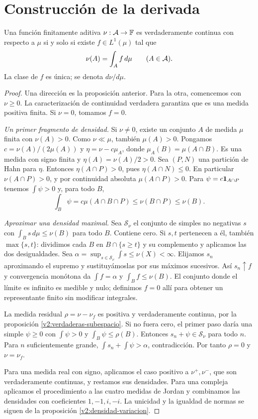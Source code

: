 \section{Construcción de la derivada}
\begin{teorema}\label{v2:radon-nikodym}
Una función finitamente aditiva $\nu:\mathcal A\to\mathbb F$ es verdaderamente continua con respecto a $\mu$ si y solo si existe $f\in L^1(\mu)$ tal que
\[
 \nu(A)=\int_A f\,d\mu\qquad(A\in\mathcal A).
\]
La clase de $f$ es única; se denota $d\nu/d\mu$.
\end{teorema}
\begin{proof}
Una dirección es la proposición anterior. Para la otra, comencemos con $\nu\ge0$. La caracterización de continuidad verdadera garantiza que es una medida positiva finita. Si $\nu=0$, tomamos $f=0$.

\emph{Un primer fragmento de densidad.} Si $\nu\ne0$, existe un conjunto $A$ de medida $\mu$ finita con $\nu(A)>0$. Como $\nu\ll\mu$, también $\mu(A)>0$. Pongamos $c=\nu(A)/(2\mu(A))$ y $\eta=\nu-c\mu_A$, donde $\mu_A(B)=\mu(A\cap B)$. Es una medida con signo finita y $\eta(A)=\nu(A)/2>0$. Sea $(P,N)$ una partición de Hahn para $\eta$. Entonces $\eta(A\cap P)>0$, pues $\eta(A\cap N)\le0$. En particular $\nu(A\cap P)>0$, y por continuidad absoluta $\mu(A\cap P)>0$. Para $\psi=c\mathbf1_{A\cap P}$ tenemos $\int\psi>0$ y, para todo $B$,
\[
 \int_B\psi=c\mu(A\cap B\cap P)\le\nu(B\cap P)\le\nu(B).
\]

\emph{Aproximar una densidad maximal.} Sea $\mathcal S_\nu$ el conjunto de simples no negativas $s$ con $\int_Bs\,d\mu\le\nu(B)$ para todo $B$. Contiene cero. Si $s,t$ pertenecen a él, también $\max\{s,t\}$: dividimos cada $B$ en $B\cap\{s\ge t\}$ y su complemento y aplicamos las dos desigualdades. Sea $\alpha=\sup_{s\in\mathcal S_\nu}\int s\le\nu(X)<\infty$. Elijamos $s_n$ aproximando el supremo y sustituyámoslas por sus máximos sucesivos. Así $s_n\uparrow f$ y convergencia monótona da $\int f=\alpha$ y $\int_B f\le\nu(B)$. El conjunto donde el límite es infinito es medible y nulo; definimos $f=0$ allí para obtener un representante finito sin modificar integrales.

La medida residual $\rho=\nu-\nu_f$ es positiva y verdaderamente continua, por la proposición \ref{v2:verdaderas-subespacio}. Si no fuera cero, el primer paso daría una simple $\psi\ge0$ con $\int\psi>0$ y $\int_B\psi\le\rho(B)$. Entonces $s_n+\psi\in\mathcal S_\nu$ para todo $n$. Para $n$ suficientemente grande, $\int s_n+\int\psi>\alpha$, contradicción. Por tanto $\rho=0$ y $\nu=\nu_f$.

Para una medida real con signo, aplicamos el caso positivo a $\nu^+,\nu^-$, que son verdaderamente continuas, y restamos sus densidades. Para una compleja aplicamos el procedimiento a las cuatro medidas de Jordan y combinamos las densidades con coeficientes $1,-1,i,-i$. La unicidad y la igualdad de normas se siguen de la proposición \ref{v2:densidad-variacion}.
\end{proof}
